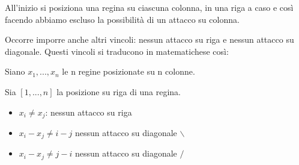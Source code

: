 All'inizio si posiziona una regina su ciascuna colonna, in una riga a caso e
così facendo abbiamo escluso la possibilità di un attacco su colonna.

Occorre imporre anche altri vincoli: nessun attacco su riga e nessun attacco su
diagonale. Questi vincoli si traducono in matematichese così:

Siano $x_1,...,x_n$ le n regine posizionate su n colonne.

Sia $[1,...,n]$ la posizione su riga di una regina.

\begin{itemize}
 \item $x_i \neq x_j$: nessun attacco su riga
 \item $x_i - x_j \neq i-j$ nessun attacco su diagonale $\backslash$
 \item $x_i - x_j \neq j-i$ nessun attacco su diagonale $/$
\end{itemize}
